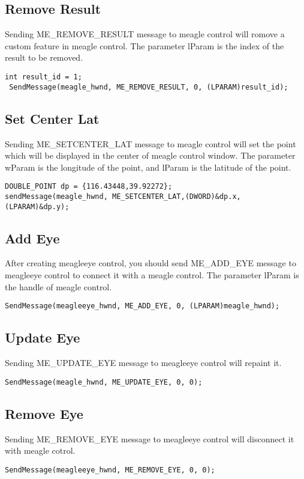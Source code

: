 \documentclass[a4paper]{article}
\begin{document}
\subsection{Remove Result}
Sending ME\_REMOVE\_RESULT message to meagle control will romove a custom feature in meagle control. The parameter lParam is the index of the result to be removed. 
\begin{lstlisting}
int result_id = 1;
 SendMessage(meagle_hwnd, ME_REMOVE_RESULT, 0, (LPARAM)result_id);
\end{lstlisting}

\subsection{Set Center Lat}
Sending ME\_SETCENTER\_LAT message to meagle control will set the point which will be displayed in the center of meagle control window. The parameter wParam is the longitude of the point, and lParam is the latitude of the point.
\begin{lstlisting}
DOUBLE_POINT dp = {116.43448,39.92272};
sendMessage(meagle_hwnd, ME_SETCENTER_LAT,(DWORD)&dp.x, (LPARAM)&dp.y);
\end{lstlisting}


\subsection{Add Eye}
After creating meagleeye control, you should send ME\_ADD\_EYE message to meagleeye control to connect it with a meagle control. The parameter lParam is the handle of meagle control. 
\begin{lstlisting}
SendMessage(meagleeye_hwnd, ME_ADD_EYE, 0, (LPARAM)meagle_hwnd);
\end{lstlisting}

\subsection{Update Eye}
Sending ME\_UPDATE\_EYE message to meagleeye control will repaint it.
\begin{lstlisting}
SendMessage(meagle_hwnd, ME_UPDATE_EYE, 0, 0);
\end{lstlisting}

\subsection{Remove Eye}
Sending ME\_REMOVE\_EYE message to meagleeye control will disconnect it with meagle cotrol.
\begin{lstlisting}
SendMessage(meagleeye_hwnd, ME_REMOVE_EYE, 0, 0);
\end{lstlisting}
\end{document}
